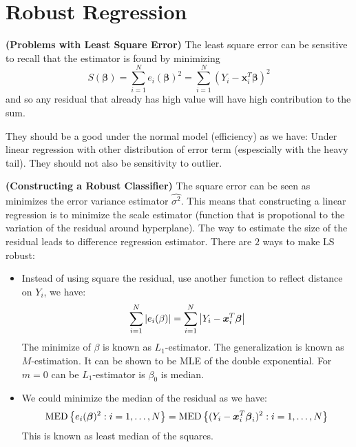 \section{Robust Regression}

\begin{remark}{\textbf{(Problems with Least Square Error)}}
    The least square error can be sensitive to recall that the estimator is found by minimizing 
    \begin{equation*}
        S(\boldsymbol \beta) = \sum^N_{i=1}e_i(\boldsymbol \beta)^2 = \sum^N_{i=1}(Y_i - \boldsymbol x_i^T\boldsymbol \beta)^2
    \end{equation*}
    and so any residual that already has high value will have high contribution to the sum. 
\end{remark}

\begin{remark}
    They should be a good under the normal model (efficiency) as we have: Under linear regression with other distribution of error term (espescially with the heavy tail). They should not also be sensitivity to outlier.     
\end{remark}

\begin{remark}{\textbf{(Constructing a Robust Classifier)}}
    The square error can be seen as minimizes the error variance estimator $\hat{\sigma^2}$. This means that constructing a linear regression is to minimize the scale estimator (function that is propotional to the variation of the residual around hyperplane). The way to estimate the size of the residual leads to difference regression estimator. There are $2$ ways to make LS robust:
    \begin{itemize}
        \item Instead of using square the residual, use another function to reflect distance on $Y_i$, we have:
        \begin{equation*}
            \sum^N_{i=1}\left| e_i(\beta) \right| = \sum^N_{i=1}\left| Y_i - \boldsymbol x_i^T\boldsymbol \beta \right|
        \end{equation*}
        The minimize of $\beta$ is known as $L_1$-estimator. The generalization is known as $M$-estimation. It can be shown to be MLE of the double exponential. For $m=0$ can be $L_1$-estimator is $\beta_0$ is median. 
        \item We could minimize the median of the residual as we have:
        \begin{equation*}
            \operatorname{MED}\left\{ e_i(\boldsymbol \beta)^2 : i =1,\dots,N \right\} = \operatorname{MED}\left\{ (Y_i - \boldsymbol x_i^T\boldsymbol \beta_i)^2 : i = 1,\dots, N \right\}
        \end{equation*}
        This is known as least median of the squares. 
    \end{itemize}
\end{remark}

